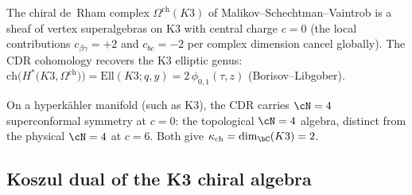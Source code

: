 \begin{remark}[CDR on K3]
\label{rem:cdr-k3}
The chiral de~Rham complex $\Omega^{\mathrm{ch}}(K3)$ of
Malikov--Schechtman--Vaintrob is a sheaf of vertex
superalgebras on K3 with central charge $c = 0$ (the local
contributions $c_{\beta\gamma} = +2$ and $c_{bc} = -2$ per
complex dimension cancel globally). The CDR cohomology
recovers the K3 elliptic genus:
$\mathrm{ch}\bigl(H^*\bigl(K3, \Omega^{\mathrm{ch}}\bigr)\bigr)
= \mathrm{Ell}(K3; q, y) = 2\,\phi_{0,1}(\tau, z)$
(Borisov--Libgober).

On a hyperk\"ahler manifold (such as K3), the CDR carries
$\cN = 4$ superconformal symmetry at $c = 0$: the
topological $\cN = 4$ algebra, distinct from the physical
$\cN = 4$ at $c = 6$. Both give
$\kappa_{\mathrm{ch}} = \dim_\bC(K3) = 2$.
\end{remark}

\subsection{Koszul dual of the K3 chiral algebra}
\label{subsec:koszul-dual-k3}

